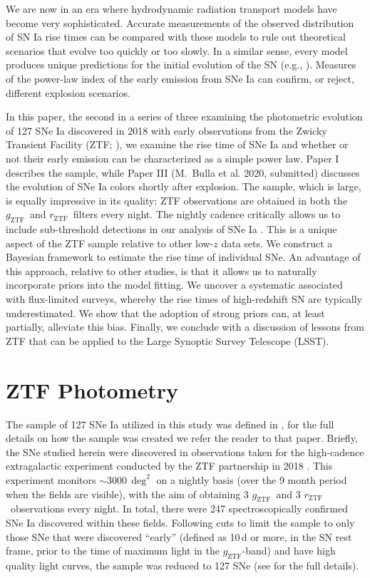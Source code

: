 \documentclass[twocolumn]{./aastex63}
\newcommand{\rztf}{$r_\mathrm{ZTF}$}
\newcommand{\gztf}{$g_\mathrm{ZTF}$}
\begin{document}
We are now in an era where hydrodynamic radiation transport models have become
very sophisticated. Accurate measurements of the observed distribution of SN Ia
rise times can be compared with these models to rule out theoretical scenarios
that evolve too quickly or too slowly. In a similar sense, every model produces
unique predictions for the initial evolution of the SN (e.g.,
\citealt{Noebauer17}). Measures of the power-law index of the early emission
from SNe Ia can confirm, or reject, different explosion scenarios.

In this paper, the second in a series of three examining the photometric
evolution of 127 SNe Ia discovered in 2018 with early observations from the
Zwicky Transient Facility (ZTF; \citealt{Bellm19,Graham19}), we examine the rise
time of SNe Ia and whether or not their early emission can be characterized as a
simple power law. Paper I \citep{Yao19} describes the sample, while Paper III
(M.\ Bulla et al. 2020, submitted) discusses the evolution of SNe Ia colors
shortly after explosion. The sample, which is large, is equally impressive in
its quality: ZTF observations are obtained in both the \gztf\ and \rztf\ filters
every night. The nightly cadence critically allows us to include sub-threshold
detections in our analysis of SNe Ia \citep{Yao19}. This is a unique aspect of
the ZTF sample relative to other low-$z$ data sets. We construct a Bayesian
framework to estimate the rise time of individual SNe. An advantage of this
approach, relative to other studies, is that it allows us to naturally
incorporate priors into the model fitting. We uncover a systematic associated
with flux-limited surveys, whereby the rise times of high-redshift SN are
typically underestimated. We show that the adoption of strong priors can, at
least partially, alleviate this bias. Finally, we conclude with a discussion of
lessons from ZTF that can be applied to the Large Synoptic Survey Telescope
(LSST).

\section{ZTF Photometry}

The sample of 127 SNe Ia utilized in this study was defined in \citet{Yao19},
for the full details on how the sample was created we refer the reader to
that paper. Briefly, the SNe studied herein were discovered in observations
taken for the high-cadence extragalactic experiment conducted by the ZTF
partnership in 2018 \citep{Bellm19a}. This experiment monitors
$\sim$3000\,$\deg^2$ on a nightly basis (over the 9 month period when the
fields are visible), with the aim of obtaining 3 \gztf\ and 3 \rztf\
observations every night. In total, there were 247 spectroscopically
confirmed SNe Ia discovered within these fields. Following cuts to limit the
sample to only those SNe that were discovered ``early'' (defined as 10\,d or
more, in the SN rest frame, prior to the time of maximum light in the
\gztf-band) and have high quality light curves, the sample was reduced to 127
SNe (see \citealt{Yao19} for the full details).
\end{document}

